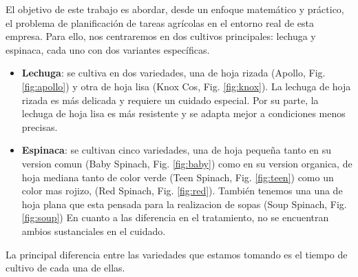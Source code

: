 El objetivo de este trabajo es abordar, desde un enfoque matemático y práctico, el problema de planificación de tareas agrícolas en el entorno real de esta empresa.
Para ello, nos centraremos en dos cultivos principales: lechuga y espinaca, cada uno con dos variantes específicas.
\begin{itemize}
    \item \textbf{Lechuga}: se cultiva en dos variedades, una de hoja rizada (Apollo, Fig. \ref{fig:apollo}) y otra de hoja lisa (Knox Cos, Fig. \ref{fig:knox}). La lechuga de hoja rizada es más delicada y requiere un cuidado especial. Por su parte, la lechuga de hoja lisa es más resistente y se adapta mejor a condiciones menos precisas.
    \item \textbf{Espinaca}: se cultivan cinco variedades, una de hoja pequeña tanto en su version comun (Baby Spinach, Fig. \ref{fig:baby}) como en su version organica, de hoja mediana tanto de color verde (Teen Spinach, Fig. \ref{fig:teen}) como un color mas rojizo, (Red Spinach, Fig. \ref{fig:red}). También tenemos una 
    una de hoja plana que esta pensada para la realizacion de sopas (Soup Spinach, Fig. \ref{fig:soup})
    En cuanto a las diferencia en el tratamiento, no se encuentran ambios sustanciales en el cuidado.
\end{itemize}
La principal diferencia entre las variedades que estamos tomando es el tiempo de cultivo de cada una de ellas. 
